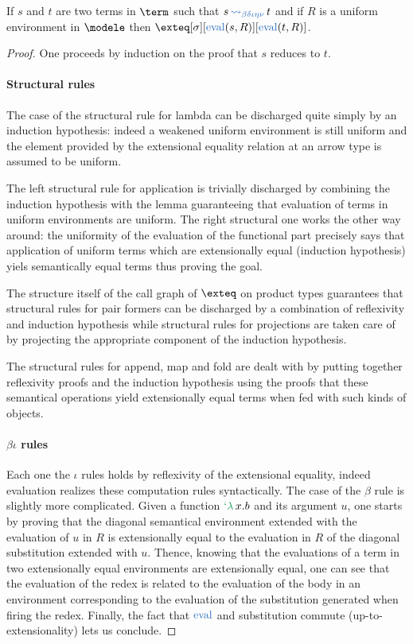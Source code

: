 \begin{theorem}If $s$ and $t$ are two terms in $\term$ such that $s \reduce t$
and if $R$ is a uniform environment in $\modele$ then
$\exteq[\sigma][\termeval(s , R)][\termeval(t , R)]$.
\end{theorem}
\begin{proof}One proceeds by induction on the proof that $s$ reduces to $t$.
\paragraph{Structural rules} The case of the structural rule for lambda can be
discharged quite simply by an induction hypothesis: indeed a weakened uniform
environment is still uniform and the element provided by the extensional equality
relation at an arrow type is assumed to be uniform.

The left structural rule for application is trivially discharged by combining the
induction hypothesis with the lemma guaranteeing that evaluation of terms in uniform
environments are uniform. The right structural one works the other way around:
the uniformity of the evaluation of the functional part precisely says that
application of uniform terms which are extensionally equal (induction hypothesis)
yiels semantically equal terms thus proving the goal.

The structure itself of the call graph of $\exteq$ on product types guarantees
that structural rules for pair formers can be discharged by a combination of
reflexivity and induction hypothesis while structural rules for projections are
taken care of by projecting the appropriate component of the induction hypothesis.

The structural rules for append, map and fold are dealt with by putting together
reflexivity proofs and the induction hypothesis using the proofs that these
semantical operations yield extensionally equal terms when fed with such kinds
of objects.

\paragraph{$\beta\iota$ rules} Each one the $\iota$ rules holds by reflexivity of
the extensional equality, indeed evaluation realizes these computation rules
syntactically. The case of the $\beta$ rule is slightly more complicated. Given a
function $\telam x. b$ and its argument $u$, one starts by proving that the diagonal
semantical environment extended with the evaluation of $u$ in $R$ is extensionally
equal to the evaluation in $R$ of the diagonal substitution extended with $u$.
Thence, knowing that the evaluations of a term in two extensionally equal
environments are extensionally equal, one can see that the evaluation of the
redex is related to the evaluation of the body in an environment corresponding
to the evaluation of the substitution generated when firing the redex. Finally,
the fact that $\termeval$ and substitution commute (up-to-extensionality) lets us
conclude.


\end{proof}
